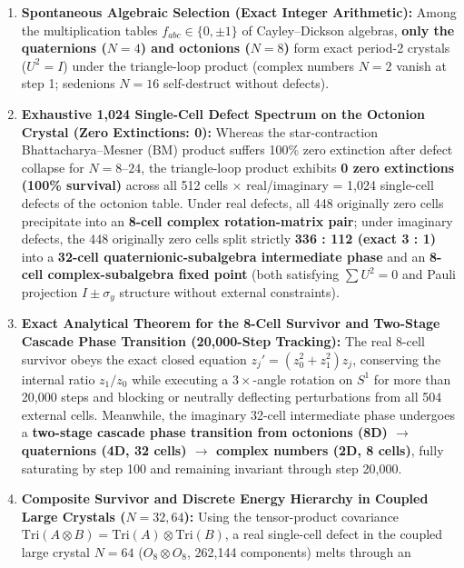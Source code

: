 \documentclass[
  a4paper,
]{article}
\providecommand{\tightlist}{%
  \setlength{\itemsep}{0pt}\setlength{\parskip}{0pt}}
\begin{document}
\begin{enumerate}
\def\labelenumi{\arabic{enumi}.}
\tightlist
\item
  \textbf{Spontaneous Algebraic Selection (Exact Integer Arithmetic):}
  Among the multiplication tables \(f_{abc} \in \{0, \pm 1\}\) of
  Cayley--Dickson algebras, \textbf{only the quaternions (\(N=4\)) and
  octonions (\(N=8\))} form exact period-2 crystals (\(U^2 = I\)) under
  the triangle-loop product (complex numbers \(N=2\) vanish at step 1;
  sedenions \(N=16\) self-destruct without defects).
\item
  \textbf{Exhaustive 1,024 Single-Cell Defect Spectrum on the Octonion
  Crystal (Zero Extinctions: 0):} Whereas the star-contraction
  Bhattacharya--Mesner (BM) product suffers 100\% zero extinction after
  defect collapse for \(N = 8\text{–}24\), the triangle-loop product
  exhibits \textbf{0 zero extinctions (100\% survival)} across all 512
  cells \(\times\) real/imaginary = 1,024 single-cell defects of the
  octonion table. Under real defects, all 448 originally zero cells
  precipitate into an \textbf{8-cell complex rotation-matrix pair};
  under imaginary defects, the 448 originally zero cells split strictly
  \textbf{336 : 112 (exact 3 : 1)} into a \textbf{32-cell
  quaternionic-subalgebra intermediate phase} and an \textbf{8-cell
  complex-subalgebra fixed point} (both satisfying \(\sum U^2 = 0\) and
  Pauli projection \(I \pm \sigma_y\) structure without external
  constraints).
\item
  \textbf{Exact Analytical Theorem for the 8-Cell Survivor and Two-Stage
  Cascade Phase Transition (20,000-Step Tracking):} The real 8-cell
  survivor obeys the exact closed equation
  \(z_j' = (z_0^2 + z_1^2) z_j\), conserving the internal ratio
  \(z_1/z_0\) while executing a \(3\times\)-angle rotation on \(S^1\)
  for more than 20,000 steps and blocking or neutrally deflecting
  perturbations from all 504 external cells. Meanwhile, the imaginary
  32-cell intermediate phase undergoes a \textbf{two-stage cascade phase
  transition from octonions (8D) \(\to\) quaternions (4D, 32 cells)
  \(\to\) complex numbers (2D, 8 cells)}, fully saturating by step 100
  and remaining invariant through step 20,000.
\item
  \textbf{Composite Survivor and Discrete Energy Hierarchy in Coupled
  Large Crystals (\(N = 32, 64\)):} Using the tensor-product covariance
  \(\mathrm{Tri}(A \otimes B) = \mathrm{Tri}(A) \otimes \mathrm{Tri}(B)\),
  a real single-cell defect in the coupled large crystal \(N = 64\)
  (\(O_8 \otimes O_8\), 262,144 components) melts through an

\end{enumerate}
\end{document}
